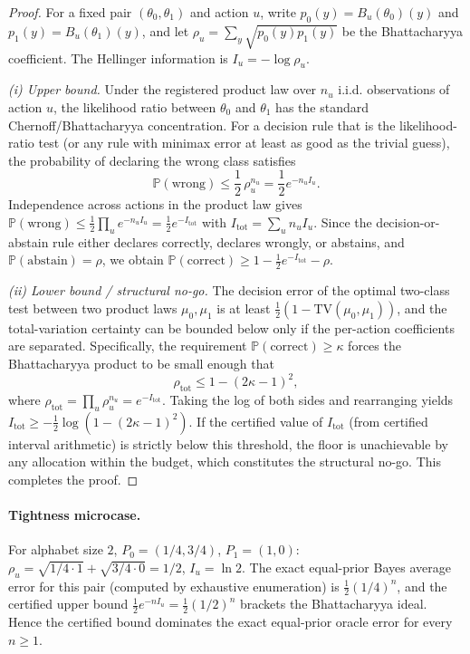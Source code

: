 \documentclass[11pt]{article}
\begin{document}
\begin{proof}
For a fixed pair $(\theta_0,\theta_1)$ and action $u$, write $p_0(y)=B_u(\theta_0)(y)$ and
$p_1(y)=B_u(\theta_1)(y)$, and let $\rho_u=\sum_{y}\sqrt{p_0(y)p_1(y)}$ be the Bhattacharyya
coefficient. The Hellinger information is $I_u=-\log\rho_u$.

\emph{(i) Upper bound.} Under the registered product law over $n_u$ i.i.d. observations of action $u$,
the likelihood ratio between $\theta_0$ and $\theta_1$ has the standard Chernoff/Bhattacharyya
concentration. For a decision rule that is the likelihood-ratio test (or any rule with minimax error at
least as good as the trivial guess), the probability of declaring the wrong class satisfies
\[
\mathbb{P}(\mathrm{wrong})\le \frac12\,\rho_u^{n_u}
=\frac12 e^{-n_u I_u}.
\]
Independence across actions in the product law gives
$\mathbb{P}(\mathrm{wrong})\le\tfrac12\prod_u e^{-n_u I_u}=\tfrac12 e^{-I_{\mathrm{tot}}}$ with
$I_{\mathrm{tot}}=\sum_u n_u I_u$. Since the decision-or-abstain rule either declares correctly, declares
wrongly, or abstains, and $\mathbb{P}(\mathrm{abstain})=\rho$, we obtain
$\mathbb{P}(\mathrm{correct})\ge 1-\tfrac12 e^{-I_{\mathrm{tot}}}-\rho$.

\emph{(ii) Lower bound / structural no-go.} The decision error of the optimal two-class test between two
product laws $\mu_0,\mu_1$ is at least $\tfrac12(1-\mathrm{TV}(\mu_0,\mu_1))$, and the total-variation
certainty can be bounded below only if the per-action coefficients are separated. Specifically, the
requirement $\mathbb{P}(\mathrm{correct})\ge\kappa$ forces the Bhattacharyya product to be small enough
that
\[
\rho_{\mathrm{tot}}\le 1-(2\kappa-1)^2,
\]
where $\rho_{\mathrm{tot}}=\prod_u\rho_u^{n_u}=e^{-I_{\mathrm{tot}}}$. Taking the log of both sides and
rearranging yields $I_{\mathrm{tot}}\ge -\tfrac12\log(1-(2\kappa-1)^2)$. If the certified value of
$I_{\mathrm{tot}}$ (from certified interval arithmetic) is strictly below this threshold, the floor is
unachievable by any allocation within the budget, which constitutes the structural no-go. This completes
the proof.
\end{proof}

\paragraph{Tightness microcase.}
For alphabet size $2$, $P_0=(1/4,3/4)$, $P_1=(1,0)$: $\rho_u=\sqrt{1/4\cdot1}+\sqrt{3/4\cdot0}=1/2$,
$I_u=\ln2$. The exact equal-prior Bayes average error for this pair (computed by exhaustive enumeration) is
$\tfrac12(1/4)^n$, and the certified upper bound $\tfrac12 e^{-nI_u}=\tfrac12(1/2)^n$ brackets the
Bhattacharyya ideal. Hence the certified bound dominates the exact equal-prior oracle error for every $n\ge 1$.
\end{document}
